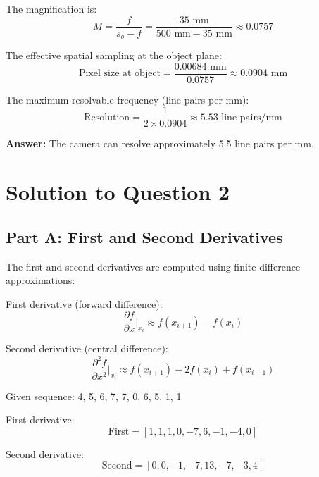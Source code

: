 \documentclass[12pt,a4paper]{article}
\begin{document}
The magnification is:
\begin{equation*}
M = \frac{f}{s_o - f} = \frac{35 \text{ mm}}{500 \text{ mm} - 35 \text{ mm}} \approx 0.0757
\end{equation*}

The effective spatial sampling at the object plane:
\begin{equation*}
\text{Pixel size at object} = \frac{0.00684 \text{ mm}}{0.0757} \approx 0.0904 \text{ mm}
\end{equation*}

The maximum resolvable frequency (line pairs per mm):
\begin{equation*}
\text{Resolution} = \frac{1}{2 \times 0.0904} \approx 5.53 \text{ line pairs/mm}
\end{equation*}

\textbf{Answer:} The camera can resolve approximately 5.5 line pairs per mm.

\vspace{1.0cm}
\section*{Solution to Question 2}

\subsection*{Part A: First and Second Derivatives}

The first and second derivatives are computed using finite difference approximations:

First derivative (forward difference):
\begin{equation*}
\frac{\partial f}{\partial x}\bigg|_{x_i} \approx f(x_{i+1}) - f(x_i)
\end{equation*}

Second derivative (central difference):
\begin{equation*}
\frac{\partial^2 f}{\partial x^2}\bigg|_{x_i} \approx f(x_{i+1}) - 2f(x_i) + f(x_{i-1})
\end{equation*}

Given sequence: 4, 5, 6, 7, 7, 0, 6, 5, 1, 1

First derivative:
\begin{equation*}
\text{First} = [1, 1, 1, 0, -7, 6, -1, -4, 0]
\end{equation*}

Second derivative:
\begin{equation*}
\text{Second} = [0, 0, -1, -7, 13, -7, -3, 4]
\end{equation*}
\end{document}
